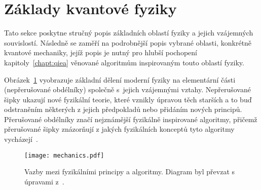 \section{Základy kvantové fyziky}
Tato sekce poskytne stručný popis základních oblastí fyziky a jejich vzájemných souvislostí. 
Následně se zaměří na podrobnější popis vybrané oblasti, konkrétně kvantové mechaniky, jejíž popis je nutný pro hlubší pochopení kapitoly~\ref{chapt:qiea} věnované algoritmům inspirovaným touto oblastí fyziky.

Obrázek~\ref{fig:mechanics} vyobrazuje základní dělení moderní fyziky na elementární části (nepřerušované obdélníky) společně s~jejich vzájemnými vztahy. 
Nepřerušované šipky ukazují nové fyzikální teorie, které vznikly úpravou těch starších a to buď odstraněním některých z jejich předpokladů nebo přidáním nových principů.
Přerušované obdélníky značí nejznámější fyzikálně inspirované algoritmy, přičemž přerušované šipky znázorňují z jakých fyzikálních konceptů tyto algoritmy vycházejí~\cite{NaturalComputing}.

\begin{figure}[ht!]
    \centering
    \texttt{[image: mechanics.pdf]}
    \caption{Vazby mezi fyzikálními principy a algoritmy. Diagram byl převzat s úpravami z~\cite{NaturalComputing}.}
    \label{fig:mechanics}
\end{figure}

